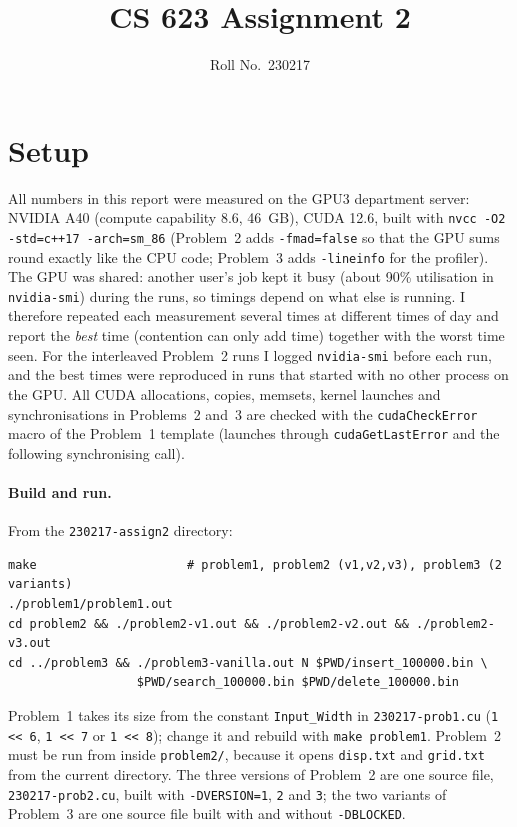 \documentclass[11pt]{article}
\title{CS 623 Assignment 2}
\author{Roll No.\ 230217}
\date{}
\begin{document}
\maketitle

\section*{Setup}
All numbers in this report were measured on the GPU3 department server:
NVIDIA A40 (compute capability 8.6, 46~GB), CUDA 12.6, built with
\texttt{nvcc -O2 -std=c++17 -arch=sm\_86} (Problem~2 adds \texttt{-fmad=false}
so that the GPU sums round exactly like the CPU code; Problem~3 adds
\texttt{-lineinfo} for the profiler). The GPU was shared: another user's job
kept it busy (about 90\% utilisation in \texttt{nvidia-smi}) during the runs,
so timings depend on what else is running. I therefore repeated each
measurement several times at different times of day and report the \emph{best}
time (contention can only add time) together with the worst time seen. For
the interleaved Problem~2 runs I logged \texttt{nvidia-smi} before each run, and
the best times were reproduced in runs that started with no other process on
the GPU. All CUDA allocations, copies, memsets, kernel
launches and synchronisations in Problems~2 and~3 are checked with the
\texttt{cudaCheckError} macro of the Problem~1 template (launches through
\texttt{cudaGetLastError} and the following synchronising call).

\paragraph{Build and run.} From the \texttt{230217-assign2} directory:
\begin{verbatim}
make                     # problem1, problem2 (v1,v2,v3), problem3 (2 variants)
./problem1/problem1.out
cd problem2 && ./problem2-v1.out && ./problem2-v2.out && ./problem2-v3.out
cd ../problem3 && ./problem3-vanilla.out N $PWD/insert_100000.bin \
                  $PWD/search_100000.bin $PWD/delete_100000.bin
\end{verbatim}
Problem~1 takes its size from the constant \texttt{Input\_Width} in
\texttt{230217-prob1.cu} (\texttt{1 << 6}, \texttt{1 << 7} or \texttt{1 << 8});
change it and rebuild with \texttt{make problem1}. Problem~2 must be run from
inside \texttt{problem2/}, because it opens \texttt{disp.txt} and
\texttt{grid.txt} from the current directory. The three versions of Problem~2
are one source file, \texttt{230217-prob2.cu}, built with
\texttt{-DVERSION=1}, \texttt{2} and \texttt{3}; the two variants of Problem~3
are one source file built with and without \texttt{-DBLOCKED}.
\end{document}
